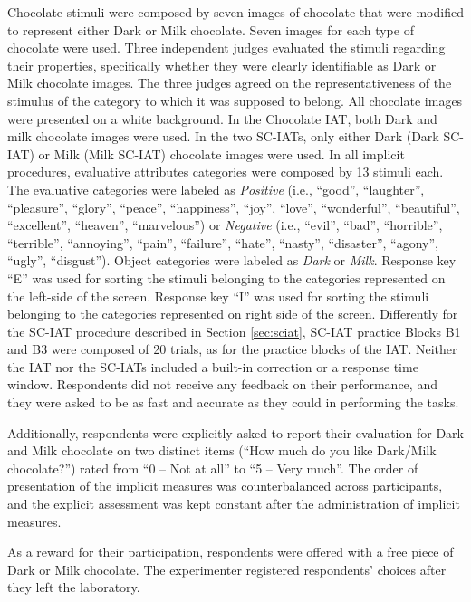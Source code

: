 \documentclass[12pt]{book}
\begin{document}
Chocolate stimuli were composed by seven images of chocolate that were modified to represent either Dark or Milk chocolate. Seven images for each type of chocolate were used. Three independent judges evaluated the stimuli regarding their properties, specifically whether they were clearly identifiable as Dark or Milk chocolate images. The three judges agreed on the representativeness of the stimulus of the category to which it was supposed to belong. All chocolate images were presented on a white background. 
In the Chocolate IAT, both Dark and milk chocolate images were used. In the two SC-IATs, only either Dark (Dark SC-IAT) or Milk (Milk SC-IAT) chocolate images were used. In all implicit procedures, evaluative attributes categories were composed by 13 stimuli each. The evaluative categories were labeled as \emph{Positive} (i.e., ``good'', ``laughter'', ``pleasure'', ``glory'', ``peace'', ``happiness'', ``joy'', ``love'', ``wonderful'', ``beautiful'', ``excellent'', ``heaven'', ``marvelous'') or \emph{Negative} (i.e., ``evil'', ``bad'', ``horrible'', ``terrible'', ``annoying'', ``pain'', ``failure'', ``hate'', ``nasty'', ``disaster'', ``agony'', ``ugly'', ``disgust''). Object categories were labeled as \emph{Dark} or \emph{Milk}. Response key ``E'' was used for sorting the stimuli belonging to the categories represented on the left-side of the screen. Response key ``I'' was used for sorting the stimuli belonging to the categories represented on right side of the screen. Differently for the SC-IAT procedure described in Section \ref{sec:sciat}, SC-IAT practice Blocks B1 and B3 were composed of 20 trials, as for the practice blocks of the IAT. Neither the IAT nor the SC-IATs included a built-in correction or a response time window. Respondents did not receive any feedback on their performance, and they were asked to be as fast and accurate as they could in performing the tasks. 

Additionally, respondents were explicitly asked to report their evaluation for Dark and Milk chocolate on two distinct items (``How much do you like Dark/Milk chocolate?'') rated from ``0 – Not at all'' to ``5 – Very much''. The order of presentation of the implicit measures was counterbalanced across participants, and the explicit assessment was kept constant after the administration of implicit measures. 

As a reward for their participation, respondents were offered with a free piece of Dark or Milk chocolate. The experimenter registered respondents' choices after they left the laboratory.
\end{document}
